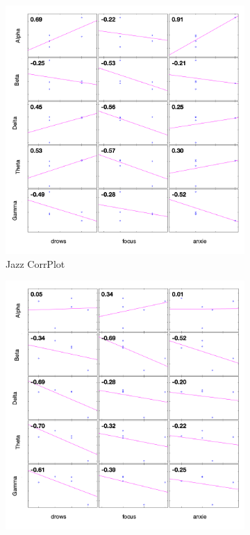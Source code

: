 \documentclass[9pt,twocolumn]{paper-template}
\begin{document}
\begin{figure}[!htbp]
  \centering
  \begin{subfigure}[b]{0.4\linewidth}
    \includegraphics[width=\linewidth]{figures/jazz_corrplot.png}
    \caption{Jazz CorrPlot}
  \end{subfigure}
  \begin{subfigure}[b]{0.4\linewidth}
    \includegraphics[width=\linewidth]{figures/rock_corrplot.png}

\end{subfigure}
\end{figure}
\end{document}
